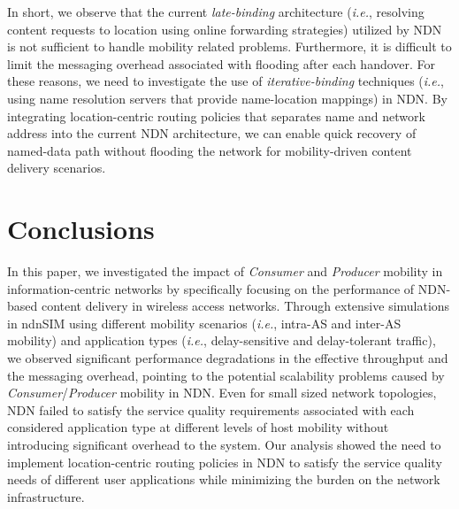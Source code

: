 \documentclass[conference]{IEEEtran}
\begin{document}
In short, we observe that the current \emph{late-binding} architecture (\emph{i.e.}, resolving content requests to location using online forwarding strategies) utilized by NDN is not sufficient to handle mobility related problems. Furthermore, it is difficult to limit the messaging overhead associated with flooding after each handover. For these reasons, we need to investigate the use of \emph{iterative-binding} techniques (\emph{i.e.}, using name resolution servers that provide name-location mappings) in NDN. By integrating location-centric routing policies that separates name and network address into the current NDN architecture, we can enable quick recovery of named-data path without flooding the network for mobility-driven content delivery scenarios.

\section{Conclusions}\label{Section:Conclusions}
In this paper, we investigated the impact of \emph{Consumer} and \emph{Producer} mobility in information-centric networks by specifically focusing on the performance of NDN-based content delivery in wireless access networks. Through extensive simulations in ndnSIM using different mobility scenarios (\emph{i.e.}, intra-AS and inter-AS mobility) and application types (\emph{i.e.}, delay-sensitive and delay-tolerant traffic), we observed significant performance degradations in the effective throughput and the messaging overhead, pointing to the potential scalability problems caused by \emph{Consumer}/\emph{Producer} mobility in NDN. Even for small sized network topologies, NDN failed to satisfy the service quality requirements associated with each considered application type at different levels of host mobility without introducing significant overhead to the system. Our analysis showed the need to implement location-centric routing policies in NDN to satisfy the service quality needs of different user applications while minimizing the burden on the network infrastructure.



\end{document}
